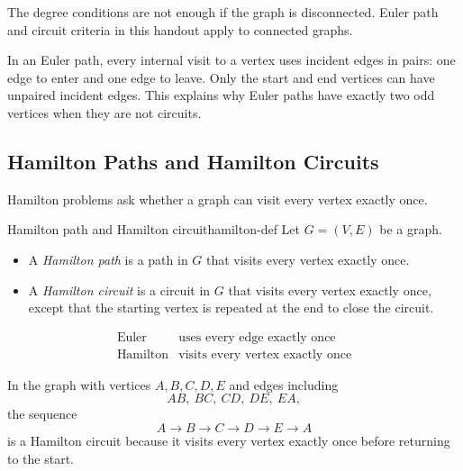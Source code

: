 \begin{commonmistake}[title={Ignoring connectedness in Euler criteria}]
The degree conditions are not enough if the graph is disconnected. Euler path and circuit criteria in this handout apply to connected graphs.
\end{commonmistake}

\begin{extension}[title={Why odd vertices are endpoints}]
In an Euler path, every internal visit to a vertex uses incident edges in pairs: one edge to enter and one edge to leave. Only the start and end vertices can have unpaired incident edges. This explains why Euler paths have exactly two odd vertices when they are not circuits.
\end{extension}

\subsection{Hamilton Paths and Hamilton Circuits}

Hamilton problems ask whether a graph can visit every vertex exactly once.

\begin{definition}{Hamilton path and Hamilton circuit}{hamilton-def}
Let \(G=(V,E)\) be a graph.
\begin{itemize}[leftmargin=*]
    \item A \emph{Hamilton path} is a path in \(G\) that visits every vertex exactly once.
    \item A \emph{Hamilton circuit} is a circuit in \(G\) that visits every vertex exactly once, except that the starting vertex is repeated at the end to close the circuit.
\end{itemize}
\end{definition}

\begin{keyformula}[title={Euler versus Hamilton}]
\[
\begin{array}{c|c}
\text{Euler} & \text{uses every edge exactly once} \\
\text{Hamilton} & \text{visits every vertex exactly once}
\end{array}
\]
\end{keyformula}

\begin{examplebox}[title={Tutorial 8, Question 8}]
In the graph with vertices \(A,B,C,D,E\) and edges including
\[
AB,\ BC,\ CD,\ DE,\ EA,
\]
the sequence
\[
A\to B\to C\to D\to E\to A
\]
is a Hamilton circuit because it visits every vertex exactly once before returning to the start.
\end{examplebox}

